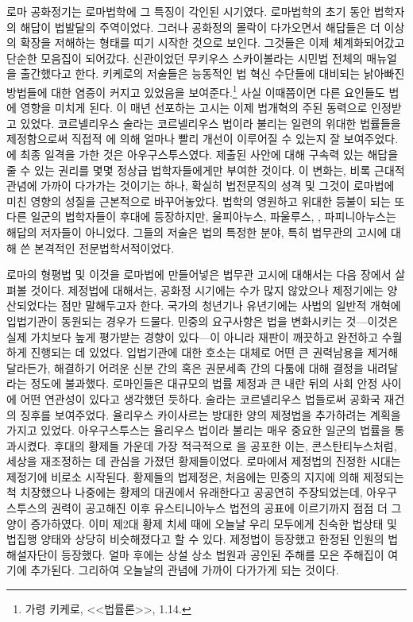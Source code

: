 로마 공화정기는 로마법학에 그 특징이 각인된 시기였다.
로마법학의 초기 동안 법학자의 해답이 법발달의 주역이었다.
그러나 공화정의 몰락이 다가오면서 해답들은 더 이상의 확장을 저해하는
형태를 띠기 시작한 것으로 보인다.
그것들은 이제 체계화되어갔고 단순한 모음집이 되어갔다.
신관이었던
무키우스 스카이볼라는
시민법 전체의 매뉴얼을 출간했다고 한다.
키케로의 저술들은
능동적인 법 혁신 수단들에 대비되는 낡아빠진 방법들에 대한 염증이
커지고 있었음을 보여준다.\footnote{%
  가령 키케로, <<법률론>>, 1.14. }
사실 이때쯤이면 다른 요인들도 법에 영향을 미치게 된다.
이 매년 선포하는 고시는
이제 법개혁의 주된 동력으로 인정받고 있었다.
코르넬리우스 술라는
코르넬리우스 법이라 불리는 일련의 위대한 법률들을
제정함으로써 직접적 에 의해 얼마나 빨리 개선이 이루어질 수 있는지
잘 보여주었다.
에 최종 일격을 가한 것은 아우구스투스였다.
제출된 사안에 대해 구속력 있는 해답을 줄 수 있는 권리를
몇몇 정상급 법학자들에게만 부여한 것이다.
이 변화는, 비록 근대적 관념에 가까이 다가가는 것이기는 하나,
확실히 법전문직의 성격 및 그것이 로마법에 미친 영향의 성질을
근본적으로 바꾸어놓았다.
법학의 영원하고 위대한 등불이 되는
또 다른 일군의 법학자들이 후대에 등장하지만,
울피아누스, 파울루스, , 파피니아누스는 해답의 저자들이 아니었다.
그들의 저술은 법의 특정한 분야, 특히 법무관의 고시에 대해 쓴
본격적인 전문법학서적이었다.

로마의 형평법 및 이것을 로마법에 만들어넣은 법무관 고시에 대해서는
다음 장에서 살펴볼 것이다.
제정법에 대해서는, 공화정 시기에는 수가 많지 않았으나
제정기에는 양산되었다는 점만 말해두고자 한다.
국가의 청년기나 유년기에는 사법의 일반적 개혁에
입법기관이 동원되는 경우가 드물다.
민중의 요구사항은 법을 변화시키는
것---이것은 실제 가치보다 높게 평가받는 경향이 있다---이 아니라
재판이 깨끗하고 완전하고 수월하게 진행되는 데 있었다.
입법기관에 대한 호소는 대체로 어떤 큰 권력남용을 제거해달라든가,
해결하기 어려운 신분 간의 혹은 권문세족 간의 다툼에 대해
결정을 내려달라는 정도에 불과했다.
로마인들은 대규모의 법률 제정과
큰 내란 뒤의 사회 안정 사이에
어떤 연관성이 있다고 생각했던 듯하다.
술라는 코르넬리우스 법들로써 공화국 재건의 징후를 보여주었다.
율리우스 카이사르는 방대한 양의 제정법을 추가하려는 계획을 가지고 있었다.
아우구스투스는 율리우스 법이라 불리는
매우 중요한 일군의 법률을 통과시켰다.
후대의 황제들 가운데 가장 적극적으로 을 공포한 이는,
콘스탄티누스처럼, 세상을 재조정하는 데 관심을 가졌던 황제들이었다.
로마에서 제정법의 진정한 시대는 제정기에 비로소 시작된다.
황제들의 법제정은,
처음에는 민중의 지지에 의해 제정되는 척 치장했으나
나중에는 황제의 대권에서 유래한다고 공공연히 주장되었는데,
아우구스투스의 권력이 공고해진 이후 유스티니아누스 법전의 공표에 이르기까지
점점 더 그 양이 증가하였다.
이미 제2대 황제 치세 때에 오늘날 우리 모두에게 친숙한 법상태 및
법집행 양태와 상당히 비슷해졌다고 할 수 있다.
제정법이 등장했고 한정된 인원의 법해설자단이 등장했다.
얼마 후에는 상설 상소 법원과 공인된 주해를 모은 주해집이 여기에 추가된다.
그리하여 오늘날의 관념에 가까이 다가가게 되는 것이다.

